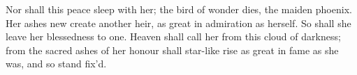 \documentclass[12pt,twoside,onecolumn,openright,extrafontsizes]{memoir}
\def\chichenitza*{Chich\'{e}n Itz\'{a}}
\begin{document}
\begin{center}
\itshape
{
	\noindent
	{
		Nor shall this peace sleep with her; the bird of wonder dies, the maiden phoenix. Her ashes new create another heir, as great in admiration as herself. So shall she leave her blessedness to one. Heaven shall call her from this cloud of darkness; from the sacred ashes of her honour shall star-like rise as great in fame as she was, and so stand fix'd.\\
		\medskip
		
	}
}
\end{center}

\frontmatter
\pagestyle{mystyle}
%
%
%
%
\end{document}
